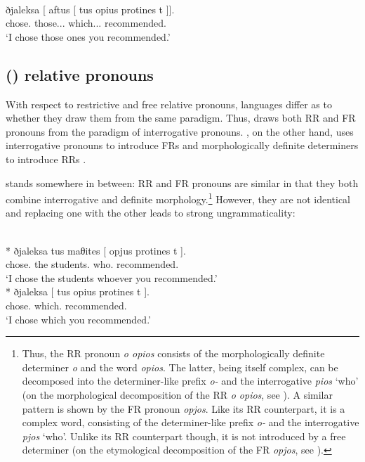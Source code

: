 \documentclass[output=paper]{langsci/langscibook}
\begin{document}
\ea {}\label{ex:01.3}\\
	\gll ðjaleksa [ aftus [ {tus opius} protines t ]].\\
    chose.\Fsg{} {} those.\M.\Pl.\Acc{} {} which.\M.\Pl.\Acc{} recommended.\Ssg{} {}\\
	\glt \enquote*{I chose those ones you recommended.}
\z

\subsection{() relative pronouns}\label{sub:01.2.2}

With respect to restrictive and free relative pronouns, languages differ as to
whether they draw them from the same paradigm. Thus,  draws both
\gls{RR} and \gls{FR} pronouns from the paradigm of interrogative pronouns.
, on the other hand, uses interrogative pronouns to introduce \glspl{FR} and
morphologically definite determiners to introduce \glspl{RR} \citep{Wiltschko1998}.

 stands somewhere in between: \gls{RR} and \gls{FR} pronouns are similar
in that they both combine interrogative and definite morphology.\footnote{
    Thus, the \gls{RR} pronoun \emph{o opios} consists of the morphologically
    definite determiner \emph{o} and the word \emph{opios}. The latter,
    being itself complex, can be decomposed into the determiner-like prefix
    \emph{o-} and the interrogative \emph{pios} ‘who’ (on the morphological
    decomposition of the \gls{RR} \emph{o opios}, see
    \citealt{Alexiadou1998}). A similar pattern is shown by the \gls{FR} pronoun
    \emph{opjos}. Like its \gls{RR} counterpart, it is a complex word,
    consisting of the determiner-like prefix \emph{o-} and the interrogative
    \emph{pjos} ‘who’. Unlike its \gls{RR} counterpart though, it is not
    introduced by a free determiner (on the etymological decomposition of the
    \gls{FR} \emph{opjos}, see \citealt{Chila-Markopoulou1994}).} However,
    they are not identical and replacing one with the other leads to strong
    ungrammaticality:

\ea {}\label{ex:01.4}\\
    * \gll ðjaleksa tus maθites [ opjus protines t ].\\
    chose.\Fsg{} the students.\Acc{} {} who.\Acc{} recommended.\Ssg{} {}\\
    \trans * \enquote*{I chose the students whoever you recommended.}
\ex {}\label{ex:01.5}\\
    * \gll ðjaleksa [ {tus opius} protines t ].\\
    chose.\Fsg{} {} which.\Acc{} recommended.\Ssg{} {}\\
    \trans * \enquote*{I chose which you recommended.}
\z
\end{document}
